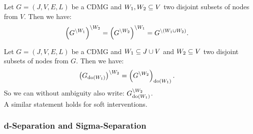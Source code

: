 \begin{Lem}
      Let $G=(J,V,E,L)$ be a CDMG and $W_1, W_2 \subseteq V$ two disjoint subsets of nodes from $V$. 
      Then we have:
      \[ \left ( G^{\setminus W_1} \right )^{\setminus W_2} = \left ( G^{\setminus W_2} \right )^{\setminus W_1} =  G^{\setminus (W_1 \cup W_2)}. \]
\end{Lem}

\begin{Lem}
      Let $G=(J,V,E,L)$ be a CDMG and $W_1 \subseteq J \cup V$ and $W_2 \subseteq V$ two disjoint subsets of nodes from $G$.
      Then we have:
      \[ \left ( G_{\operatorname{do}(W_1)} \right )^{\setminus W_2} = \left ( G^{\setminus W_2} \right )_{\operatorname{do}(W_1)}. \]
      So we can without ambiguity also write: $G_{\operatorname{do}(W_1)}^{\setminus W_2}$.\\
      A similar statement holds for soft interventions.
\end{Lem}


\subsubsection{d-Separation and Sigma-Separation}

